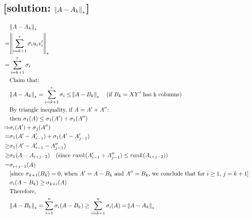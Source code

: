 \documentclass[12pt]{article}
\begin{document}
    \subsection*{[solution: $\norm{A-A_k}_*$]}
        \[
            \begin{aligned}
                &\norm{A-A_k}_*  \\
            =   &\norm{\sum_{i=k+1}^{r}\sigma_iu_iv_i'}_* \\
            =   &\sum_{i=k+1}^{r}\sigma_i\\
                &\text{Claim that:}\\
                &\norm{A-A_k}_* = \sum_{i=k+1}^{r}\sigma_i \leq \norm{A-B_k}_* \quad \text{(if $B_k=XY'$ has k columns)}\\
                &\text{By triangle inequality, if $A=A'+A''$:}\\
                &\text{then $\sigma_1(A)\leq\sigma_1(A')+\sigma_1(A'')$}\\
    \Rightarrow &\sigma_i(A')+\sigma_j(A'')\\
            =   &\sigma_1(A'-A'_{i-1})+\sigma_1(A'-A'_{j-1})\\
        \geq    &\sigma_1(A'-A'_{i-1}-A''_{j-1})\\
        \geq    &\sigma_1(A-A_{i+j-2})    \quad \text{(since $rank(A'_{i-1}+A''_{j-1})\leq rank(A_{i+j-2})$)}\\
            =   &\sigma_{i+j-1}(A)\\
                &\text{[since $\sigma_{k+1}(B_k)=0$, when $A'=A-B_k$ and $A''=B_k$, we conclude that for $i\geq 1$, $j=k+1$]}\\
                &\sigma_i(A-B_k)\geq\sigma_{k+i}(A)\\
                &\text{Therefore,}\\
                &\norm{A-B_k}_* = \sum_{i=1}^{n}\sigma_{i}(A-B_k)\geq \sum_{i=k+1}^{n}\sigma_{i}(A) = \norm{A-A_k}_*
            \end{aligned}
        \]
\end{document}

